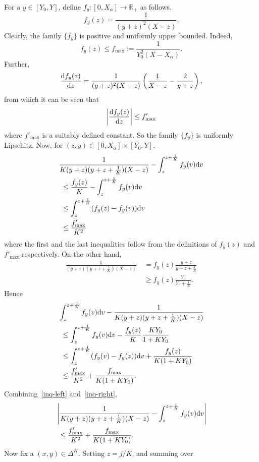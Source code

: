 \documentclass[10pt,journal,letterpaper]{IEEEtran}
\begin{document}
\begin{IEEEproof}
For a $y \in [Y_0, Y]$, define $f_y:[0, X_{\alpha}]
\rightarrow \mathbb{R}_+$ as follows.
\[
f_y(z) = \frac{1}{(y+z)^2(X-z)}.
\]
Clearly, the family $\{f_y\}$ is positive and uniformly upper
bounded. Indeed,
\[f_y(z) \leq f_{\max} := \frac{1}{Y_0^2(X-X_{\alpha})}.\]
Further,
\[
\frac{{\rm d}f_y(z)}{{\rm d}z} =
\frac{1}{(y+z)^2(X-z)}\left(\frac{1}{X-z}-\frac{2}{y+z}\right),
\]
from which it can be seen that
\[\left|\frac{{\rm d}f_y(z)}{{\rm d}z}\right| \leq f'_{\max}\]
where $f'_{\max}$ is a suitably defined constant. So the family
$\{f_y\}$ is uniformly Lipschitz. Now, for $(z,y) \in [0,
X_{\alpha}] \times [Y_0, Y]$,
\begin{align}
&\frac{1}{K(y+z)(y+z+\frac{1}{K})(X-z)}  - \int_z^{z + \frac{1}{K}}f_y(v){\rm d}v \nonumber \\
&~\leq \frac{f_y(z)}{K} - \int_z^{z +\frac{1}{K}}f_y(v){\rm d}v \nonumber \\
&~\leq \int_z^{z +\frac{1}{K}}(f_y(z) - f_y(v)){\rm d}v \nonumber \\
&~\leq \frac{f'_{\max}}{K^2} \label{inq-left}
\end{align}
where the first and the last inequalities follow from the
definitions of $f_y(z)$ and $f'_{\max}$ respectively. On the other
hand,
\begin{align*}
\frac{1}{(y+z)(y+z+\frac{1}{K})(X-z)} &~= f_y(z)\frac{y+z}{y+z+\frac{1}{K}} \\
&~\geq  f_y(z) \frac{Y_0}{Y_0 + \frac{1}{K}}.
\end{align*}
Hence
\begin{align}
&\int_z^{z + \frac{1}{K}}f_y(v){\rm d}v - \frac{1}{K(y+z)(y+z+\frac{1}{K})(X-z)} \nonumber \\
&~\leq \int_z^{z +\frac{1}{K}}f_y(v){\rm d}v - \frac{f_y(z)}{K} \frac{K Y_0}{1  + K Y_0} \nonumber \\
&~\leq \int_z^{z +\frac{1}{K}}(f_y(v) - f_y(z)){\rm d}v + \frac{f_y(z)}{K(1  + K Y_0)} \nonumber \\
&~ \leq \frac{f'_{\max}}{K^2} + \frac{f_{\max}}{K(1 + KY_0)}
\label{inq-right}.
\end{align}
Combining~\eqref{inq-left} and~\eqref{inq-right},
\begin{align*}
&\left|\frac{1}{K(y+z)(y+z+\frac{1}{K})(X-z)} - \int_z^{z + \frac{1}{K}}f_y(v){\rm d}v \right| \\
&~\leq \frac{f'_{\max}}{K^2} + \frac{f_{\max}}{K(1 + KY_0)}.
\end{align*}
Now fix a $(x,y) \in \Delta^K$. Setting $z = j/K$, and summing over

\end{IEEEproof}
\end{document}
